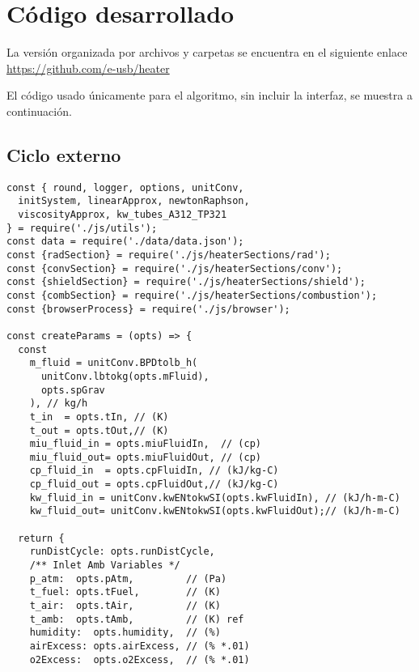 \chapter{Código desarrollado}\label{apx:code}

\par La versión organizada por archivos y carpetas se encuentra en el siguiente enlace \url{https://github.com/e-usb/heater}

\par El código usado únicamente para el algoritmo, sin incluir la interfaz, se muestra a continuación.

\section{Ciclo externo}

\begin{verbatim}
const { round, logger, options, unitConv, 
  initSystem, linearApprox, newtonRaphson, 
  viscosityApprox, kw_tubes_A312_TP321
} = require('./js/utils');
const data = require('./data/data.json');
const {radSection} = require('./js/heaterSections/rad');
const {convSection} = require('./js/heaterSections/conv');
const {shieldSection} = require('./js/heaterSections/shield');
const {combSection} = require('./js/heaterSections/combustion');
const {browserProcess} = require('./js/browser');

const createParams = (opts) => {
  const
    m_fluid = unitConv.BPDtolb_h(
      unitConv.lbtokg(opts.mFluid),
      opts.spGrav
    ), // kg/h
    t_in  = opts.tIn, // (K)
    t_out = opts.tOut,// (K)
    miu_fluid_in = opts.miuFluidIn,  // (cp)
    miu_fluid_out= opts.miuFluidOut, // (cp)
    cp_fluid_in  = opts.cpFluidIn, // (kJ/kg-C)
    cp_fluid_out = opts.cpFluidOut,// (kJ/kg-C) 
    kw_fluid_in = unitConv.kwENtokwSI(opts.kwFluidIn), // (kJ/h-m-C)
    kw_fluid_out= unitConv.kwENtokwSI(opts.kwFluidOut);// (kJ/h-m-C)

  return {
    runDistCycle: opts.runDistCycle,
    /** Inlet Amb Variables */
    p_atm:  opts.pAtm,         // (Pa) 
    t_fuel: opts.tFuel,        // (K) 
    t_air:  opts.tAir,         // (K)
    t_amb:  opts.tAmb,         // (K) ref
    humidity:  opts.humidity,  // (%) 
    airExcess: opts.airExcess, // (% *.01) 
    o2Excess:  opts.o2Excess,  // (% *.01) 
    

\end{verbatim}
